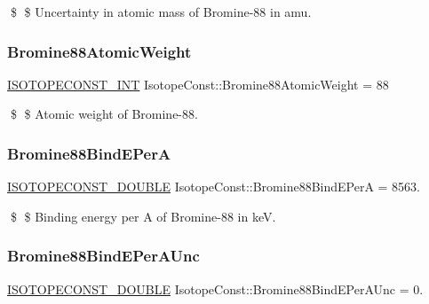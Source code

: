 \$ \$ Uncertainty in atomic mass of Bromine-\/88 in amu. \mbox{\label{group___isotope_const-_bromine-_br88_gad349144da916884628b3bab2d2c4f99b}} 
\subsubsection{\texorpdfstring{Bromine88\+Atomic\+Weight}{Bromine88AtomicWeight}}
{\footnotesize\ttfamily \mbox{\hyperlink{group___isotope_const-_macros_ga5f18360b3e99483a35c32d789e62621c}{I\+S\+O\+T\+O\+P\+E\+C\+O\+N\+S\+T\+\_\+\+I\+NT}} Isotope\+Const\+::\+Bromine88\+Atomic\+Weight = 88}

\$ \$ Atomic weight of Bromine-\/88. \mbox{\label{group___isotope_const-_bromine-_br88_ga9de28022ac26dd00830529109de8f1a8}} 
\subsubsection{\texorpdfstring{Bromine88\+Bind\+E\+PerA}{Bromine88BindEPerA}}
{\footnotesize\ttfamily \mbox{\hyperlink{group___isotope_const-_macros_ga8f45a7272ce02c0b4c65c44636ed719a}{I\+S\+O\+T\+O\+P\+E\+C\+O\+N\+S\+T\+\_\+\+D\+O\+U\+B\+LE}} Isotope\+Const\+::\+Bromine88\+Bind\+E\+PerA = 8563.}

\$ \$ Binding energy per A of Bromine-\/88 in keV. \mbox{\label{group___isotope_const-_bromine-_br88_ga25dec3b2c5a13646e7fb8bc609bd5984}} 
\subsubsection{\texorpdfstring{Bromine88\+Bind\+E\+Per\+A\+Unc}{Bromine88BindEPerAUnc}}
{\footnotesize\ttfamily \mbox{\hyperlink{group___isotope_const-_macros_ga8f45a7272ce02c0b4c65c44636ed719a}{I\+S\+O\+T\+O\+P\+E\+C\+O\+N\+S\+T\+\_\+\+D\+O\+U\+B\+LE}} Isotope\+Const\+::\+Bromine88\+Bind\+E\+Per\+A\+Unc = 0.}

